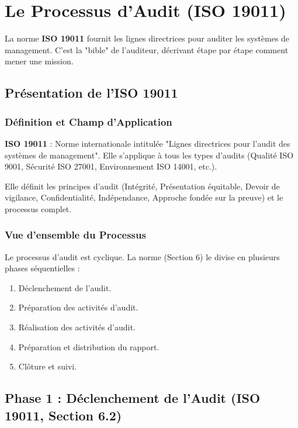 \chapter{Le Processus d'Audit (ISO 19011)}
\label{chap:procaudita}

La norme \textbf{ISO 19011} fournit les lignes directrices pour auditer les systèmes de management. C'est la "bible" de l'auditeur, décrivant étape par étape comment mener une mission.

\section{Présentation de l'ISO 19011}

\subsection{Définition et Champ d'Application}

\begin{boxdef}
\textbf{ISO 19011} : Norme internationale intitulée "Lignes directrices pour l'audit des systèmes de management". Elle s'applique à tous les types d'audits (Qualité ISO 9001, Sécurité ISO 27001, Environnement ISO 14001, etc.).
\end{boxdef}

Elle définit les principes d'audit (Intégrité, Présentation équitable, Devoir de vigilance, Confidentialité, Indépendance, Approche fondée sur la preuve) et le processus complet.

\subsection{Vue d'ensemble du Processus}

Le processus d'audit est cyclique. La norme (Section 6) le divise en plusieurs phases séquentielles :
\begin{enumerate}
    \item Déclenchement de l'audit.
    \item Préparation des activités d'audit.
    \item Réalisation des activités d'audit.
    \item Préparation et distribution du rapport.
    \item Clôture et suivi.
\end{enumerate}

\section{Phase 1 : Déclenchement de l'Audit (ISO 19011, Section 6.2)}

